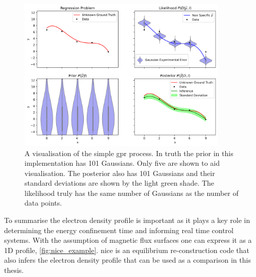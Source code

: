 \begin{figure}
  \centering
  \includegraphics[width=10cm]{images/gprvis.png}
  \caption{A visualisation of the simple \gls{gpr} process. In truth the prior in this implementation has 101 Gaussians. Only five are shown to aid visualisation. The posterior also has 101 Gaussians and their standard deviations are shown by the light green shade. The likelihood truly has the same number of Gaussians as the number of data points.}
  \label{fig:mvg}
\end{figure}

To summarise the electron density profile is important as it plays a key role in determining the energy confinement time and informing real time control systems. With the assumption of magnetic flux surfaces one can express it as a 1D profile, \ref{fig:nice_example}. \gls{nice} is an equilibrium re-construction code that also infers the electron density profile that can be used as a comparison in this thesis. 


